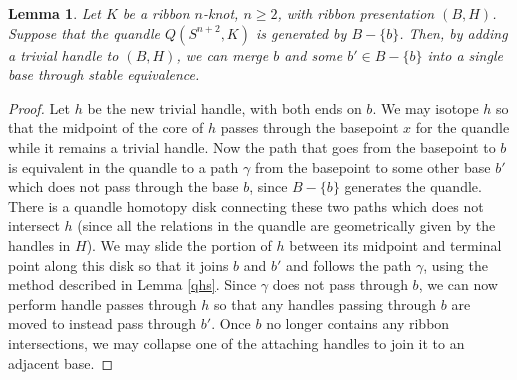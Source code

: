 \documentclass{amsart}
\newtheorem{lemma}[theorem]{Lemma}
\newtheorem{corollary}[theorem]{Corollary}
\newcommand{\bpr}{\begin{proof}}
\newcommand{\epr}{\end{proof}}
\begin{document}
\begin{lemma}
Let $K$ be a ribbon $n$-knot, $n\geq 2$, with ribbon presentation $(B, H)$. Suppose that the quandle $Q(S^{n+2}, K)$ is generated by $B-\{ b\}$. Then, by adding a trivial handle to $(B, H)$, we can merge $b$ and some $b'\in B-\{ b\}$ into a single base through stable equivalence.\label{reduce}
\end{lemma}
\bpr Let $h$ be the new trivial handle, with both ends on $b$. We may isotope $h$ so that the midpoint of the core of $h$ passes through the basepoint $x$ for the quandle while it remains a trivial handle. Now the path that goes from the basepoint to $b$ is equivalent in the quandle to a path $\gamma$ from the basepoint to some other base $b'$ which does not pass through the base $b$, since $B-\{ b\}$ generates the quandle. There is a quandle homotopy disk connecting these two paths which does not intersect $h$ (since all the relations in the quandle are geometrically given by the handles in $H$). We may slide the portion of $h$ between its midpoint and terminal point along this disk so that it joins $b$ and $b'$ and follows the path $\gamma$, using the method described in Lemma \ref{qhs}. Since $\gamma$ does not pass through $b$, we can now perform handle passes through $h$ so that any handles passing through $b$ are moved to instead pass through $b'$. Once $b$ no longer contains any ribbon intersections, we may collapse one of the attaching handles to join it to an adjacent base. \epr

\end{document}
